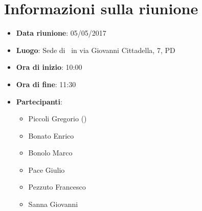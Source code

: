 \documentclass[../AnalisiDeiRequisiti.tex]{subfiles}
\begin{document}
	\section*{Informazioni sulla riunione}
		\begin{itemize}
			\item \textbf{Data riunione}: 05/05/2017
			\item \textbf{Luogo}: Sede di \proponente\ in via Giovanni Cittadella, 7, PD
			\item \textbf{Ora di inizio}: 10:00
			\item \textbf{Ora di fine}: 11:30
			\item \textbf{Partecipanti}:
				\begin{itemize}
					\item Piccoli Gregorio (\proponente)
					\item Bonato Enrico
					\item Bonolo Marco
					\item Pace Giulio
					\item Pezzuto Francesco
					\item Sanna Giovanni
				\end{itemize}
		\end{itemize}
\end{document}
